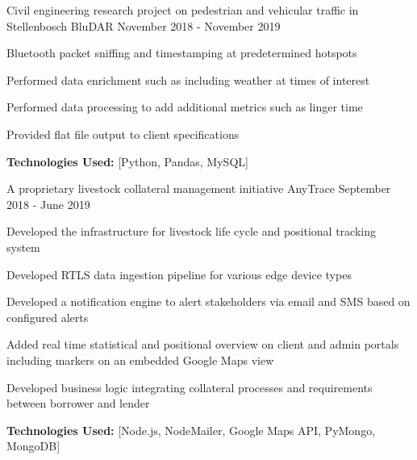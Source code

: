 \begin{cventries}
  \cventry
    {Civil engineering research project on pedestrian and vehicular traffic in Stellenbosch} %
    {BluDAR} %
    {} %
    {November 2018 - November 2019} %
    {
      \begin{cvitems} %
        \item {Bluetooth packet sniffing and timestamping at predetermined hotspots}
        \item {Performed data enrichment such as including weather at times of interest}
        \item {Performed data processing to add additional metrics such as linger time}
        \item {Provided flat file output to client specifications}
		\item {\textbf{Technologies Used:} [Python, Pandas, MySQL]}
      \end{cvitems}
    }
    
  \cventry
    {A proprietary livestock collateral management initiative} %
    {AnyTrace} %
    {} %
    {September 2018 - June 2019} %
    {
      \begin{cvitems} %
        \item {Developed the infrastructure for livestock life cycle and positional tracking system}
        \item {Developed RTLS data ingestion pipeline for various edge device types}
        \item {Developed a notification engine to alert stakeholders via email and SMS based on configured alerts}
        \item {Added real time statistical and positional overview on client and admin portals including markers on an embedded Google Maps view}
        \item {Developed business logic integrating collateral processes and requirements between borrower and lender}
		\item {\textbf{Technologies Used:} [Node.js, NodeMailer, Google Maps API, PyMongo, MongoDB]}
      \end{cvitems}
    }


\end{cventries}
